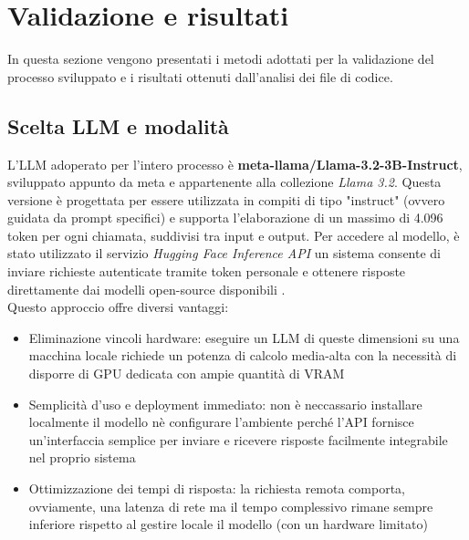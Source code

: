 \documentclass{article}
\begin{document}
\section{Validazione e risultati}
In questa sezione vengono presentati i metodi adottati per la validazione del processo sviluppato e i risultati ottenuti dall’analisi dei file di codice.

\subsection{Scelta LLM e modalità} \label{scelta LLM}
L'LLM adoperato per l'intero processo è \textbf{meta-llama/Llama-3.2-3B-Instruct}, sviluppato appunto da meta e appartenente alla collezione \textit{Llama 3.2}. Questa versione è progettata per essere utilizzata in compiti di tipo "instruct" (ovvero guidata da prompt specifici) e supporta l’elaborazione di un massimo di 4.096 token per ogni chiamata, suddivisi tra input e output.  
Per accedere al modello, è stato utilizzato il servizio \textit{Hugging Face Inference API} un sistema consente di inviare richieste autenticate tramite token personale e ottenere risposte direttamente dai modelli open-source disponibili .\\
Questo approccio offre diversi vantaggi:
\begin{itemize}
    \item Eliminazione vincoli hardware: eseguire un LLM di queste dimensioni su una macchina locale richiede un potenza di calcolo media-alta con la necessità di disporre di GPU dedicata con ampie quantità di VRAM
    \item Semplicità d'uso e deployment immediato: non è neccassario installare localmente il modello nè configurare l'ambiente perché l'API fornisce un'interfaccia semplice per inviare e ricevere risposte facilmente integrabile nel proprio sistema
    \item Ottimizzazione dei tempi di risposta: la richiesta remota comporta, ovviamente, una latenza di rete ma il tempo complessivo rimane sempre inferiore rispetto al gestire locale il modello (con un hardware limitato)
\end{itemize}
\end{document}
